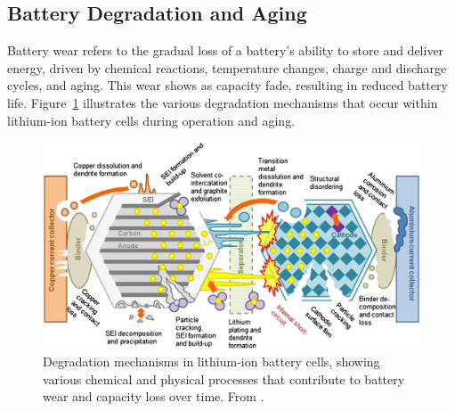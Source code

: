 \subsection{Battery Degradation and Aging}
\label{sec:degradation}

Battery wear refers to the gradual loss of a battery's ability to store and deliver energy, driven by chemical reactions, temperature changes, charge and discharge cycles, and aging. This wear shows as capacity fade, resulting in reduced battery life. Figure~\ref{fig:degradation_mechanisms} illustrates the various degradation mechanisms that occur within lithium-ion battery cells during operation and aging.

\begin{figure}[htbp]
\centering
\includegraphics[width=1\textwidth]{imgs/Degradation mechanisms in Li-ion cells.jpg}
\caption{Degradation mechanisms in lithium-ion battery cells, showing various chemical and physical processes that contribute to battery wear and capacity loss over time. From \cite{kabir_degradation_2017}.}
\label{fig:degradation_mechanisms}
\end{figure}

